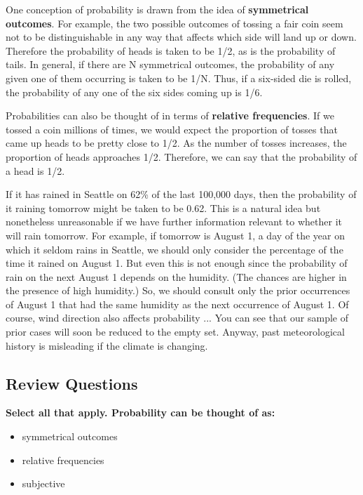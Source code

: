 \documentclass{book}
\begin{document}
One conception of probability is drawn from the idea of \textbf{symmetrical
outcomes}. For example, the two possible outcomes of tossing a fair coin seem
not to be distinguishable in any way that affects which side will land up or
down. Therefore the probability of heads is taken to be 1/2, as is the
probability of tails. In general, if there are N symmetrical outcomes, the
probability of any given one of them occurring is taken to be 1/N. Thus, if a
six-sided die is rolled, the probability of any one of the six sides coming up
is 1/6.

Probabilities can also be thought of in terms of \textbf{relative
frequencies}. If we tossed a coin millions of times, we would expect the
proportion of tosses that came up heads to be pretty close to 1/2. As the
number of tosses increases, the proportion of heads approaches 1/2. Therefore,
we can say that the probability of a head is 1/2.

If it has rained in Seattle on 62\% of the last 100,000 days, then the
probability of it raining tomorrow might be taken to be 0.62. This is a
natural idea but nonetheless unreasonable if we have further information
relevant to whether it will rain tomorrow. For example, if tomorrow is August
1, a day of the year on which it seldom rains in Seattle, we should only
consider the percentage of the time it rained on August 1. But even this is
not enough since the probability of rain on the next August 1 depends on the
humidity. (The chances are higher in the presence of high humidity.) So, we
should consult only the prior occurrences of August 1 that had the same
humidity as the next occurrence of August 1. Of course, wind direction also
affects probability ... You can see that our sample of prior cases will soon
be reduced to the empty set. Anyway, past meteorological history is misleading
if the climate is changing.

\hypertarget{review-questions}{%
\subsection{Review Questions}\label{review-questions}}

\textbf{Select all that apply. Probability can be thought of as:}

\begin{itemize}
\item
  symmetrical outcomes
\item
  relative frequencies
\item
  subjective
\end{itemize}
\end{document}
